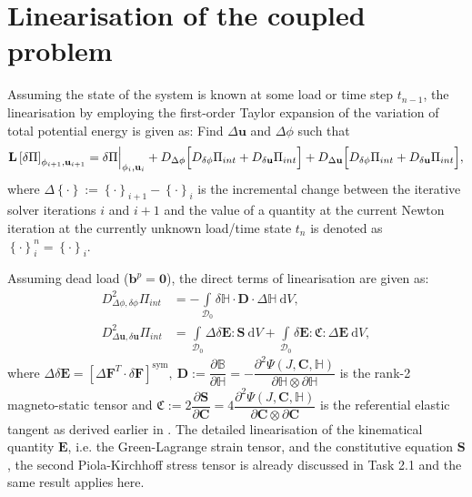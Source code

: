 \documentclass[11pt,a4paper,final]{article}
\begin{document}
\section{Linearisation of the coupled problem}
Assuming the state of the system is known at some load or time step $t_{n-1}$, the linearisation by employing the first-order Taylor expansion of the variation of total potential energy is given as: Find $\Delta \mathbf{u}$ and $\Delta \phi$ such that
\begin{equation}
\mathbf{L} \left[ \delta \Pi \right]_{\phi_{i+1}, \mathbf{u}_{i+1}} = \delta \Pi \Big{|}_{\phi_i, \mathbf{u}_i} + D_{\Delta \phi} \Big[ D_{\delta \phi} \Pi_{int} + D_{\delta \mathbf{u}} \Pi_{int} \Big] + D_{\Delta \mathbf{u}} \Big[ D_{\delta \phi} \Pi_{int} + D_{\delta \mathbf{u}} \Pi_{int} \Big],
\label{eq:3.29}
\end{equation} 
where $\Delta \left\lbrace \cdot \right\rbrace := \left\lbrace \cdot \right\rbrace_{i+1} - \left\lbrace \cdot \right\rbrace_i$ is the incremental change between the iterative solver iterations $i$ and $i+1$ and the value of a quantity at the current Newton iteration at the currently unknown load/time state $t_n$ is denoted as $\left\lbrace \cdot \right\rbrace_i^n = \left\lbrace \cdot \right\rbrace_i$.

Assuming dead load ($\mathbf{b}^p = \mathbf{0}$), the direct terms of linearisation are given as:
\begin{align}
D^2_{\Delta \phi, \delta \phi} \Pi_{int} &= - \int\limits_{\mathcal{D}_0} \delta \mathbb{H} \cdot \mathbf{D} \cdot \Delta \mathbb{H} \ \mathrm{d}V, \label{eq:3.30.1}\\
D^2_{\Delta \mathbf{u}, \delta \mathbf{u}} \Pi_{int} &= \int\limits_{\mathcal{D}_0} \Delta \delta \mathbf{E} : \mathbf{S} \ \mathrm{d}V + \int\limits_{\mathcal{D}_0} \delta \mathbf{E} : \mathfrak{C} : \Delta \mathbf{E} \ \mathrm{d}V, \label{eq:3.30.2}
\end{align}
where $\Delta \delta \mathbf{E} = \left[ \Delta \mathbf{F}^T \cdot \delta \mathbf{F} \right]^{\text{sym}}, \ \mathbf{D} := \dfrac{\partial \mathbb{B}}{\partial \mathbb{H}} = -\dfrac{\partial^2 \Psi (J, \mathbf{C}, \mathbb{H})}{\partial \mathbb{H} \otimes \partial \mathbb{H}}$ is the rank-2 magneto-static tensor and $\mathfrak{C} := 2\dfrac{\partial \mathbf{S}}{\partial \mathbf{C}} = 4\dfrac{\partial^2 \Psi (J, \mathbf{C}, \mathbb{H})}{\partial \mathbf{C} \otimes \partial \mathbf{C}}$ is the referential elastic tangent as derived earlier in . The detailed linearisation of the kinematical quantity $\mathbf{E}$, i.e. the Green-Lagrange strain tensor, and the constitutive equation $\mathbf{S}$, the second Piola-Kirchhoff stress tensor is already discussed in Task 2.1 and the same result applies here. \par 
\end{document}

